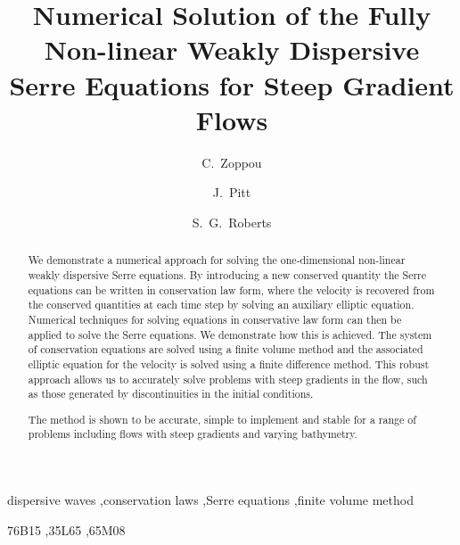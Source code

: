 \documentclass[preprint,sort&compress,1p]{article}
\begin{document}
\begin{frontmatter}

\title{Numerical Solution of the Fully Non-linear Weakly Dispersive Serre Equations for Steep Gradient Flows }

\author[msi]{C.~Zoppou}

\author[msi]{J.~Pitt}

\author[msi]{S.~G.~Roberts}

\address[msi]{Mathematical Sciences Institute, College of Physical and Mathematical Sciences, Australian National
University, Canberra, ACT 2600, Australia}

\begin{abstract}
We demonstrate a numerical approach for solving the one-dimensional non-linear weakly dispersive Serre equations.  By introducing a new conserved quantity the Serre equations can be written in conservation law form, where the velocity is recovered from the conserved quantities at each time step by solving an auxiliary elliptic equation.  Numerical techniques for solving equations in conservative law form can then be applied to solve the Serre equations. We demonstrate how this is achieved. The system of conservation equations are solved using a finite volume method and the associated elliptic equation for the velocity is solved using a finite difference method. This robust approach allows us to accurately solve problems with steep gradients in the flow, such as those generated by discontinuities in the initial conditions.

The method is shown to be accurate, simple to implement and stable for a range of problems including flows with steep gradients and varying bathymetry.
\end{abstract}

\begin{keyword}
dispersive waves \sep conservation laws \sep Serre equations \sep finite volume method

\MSC[2010] 76B15 \sep 35L65 \sep 65M08

\end{keyword}
\end{frontmatter}
\end{document}
